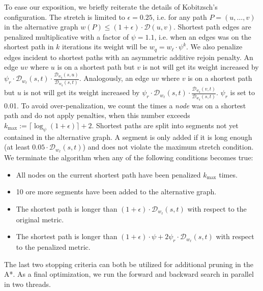 \documentclass[a4paper, english, cleveref]{lipics-v2021}
\newcommand*{\dist}{\mathcal{D}}
\begin{document}
To ease our exposition, we briefly reiterate the details of Kobitzsch's configuration.
The stretch is limited to $\epsilon = 0.25$, i.e. for any path $P = (u,\dots,v)$ in the alternative graph $w(P) \leq (1+\epsilon) \cdot \dist(u,v)$.
Shortest path edges are penalized multiplicative with a factor of $\psi = 1.1$, i.e. when an edges was on the shortest path in $k$ iterations its weight will be $w_q = w_{\ell}\cdot\psi^k$.
We also penalize edges incident to shortest paths with an asymmetric additive rejoin penalty.
An edge $uv$ where $u$ is on a shortest path but $v$ is not will get its weight increased by $\psi_r \cdot \dist_{w_{\ell}}(s,t) \cdot \frac{\dist_{w_q}(s,u)}{\dist_{w_q}(s,t)}$.
Analogously, an edge $uv$ where $v$ is on a shortest path but $u$ is not will get its weight increased by $\psi_r \cdot \dist_{w_{\ell}}(s,t) \cdot \frac{\dist_{w_q}(v,t)}{\dist_{w_q}(s,t)}$.
$\psi_r$ is set to 0.01.
To avoid over-penalization, we count the times a \emph{node} was on a shortest path and do not apply penalties, when this number exceeds $k_{\max} := \lceil\log_{\psi}(1+\epsilon)\rceil + 2$.
Shortest paths are split into segments not yet contained in the alternative graph.
A segment is only added if it is long enough (at least $0.05 \cdot \dist_{w_{\ell}}(s,t)$) and does not violate the maximum stretch condition.
We terminate the algorithm when any of the following conditions becomes true:
\begin{itemize}
  \item All nodes on the current shortest path have been penalized $k_{\max}$ times.
  \item 10 ore more segments have been added to the alternative graph.
  \item The shortest path is longer than $(1+\epsilon) \cdot \dist_{w_{\ell}}(s,t)$ with respect to the original metric.
  \item The shortest path is longer than $(1+\epsilon) \cdot \psi + 2\psi_r \cdot \dist_{w_{\ell}}(s,t)$ with respect to the penalized metric.
\end{itemize}
The last two stopping criteria can both be utilized for additional pruning in the A*.
As a final optimization, we run the forward and backward search in parallel in two threads.
\end{document}
